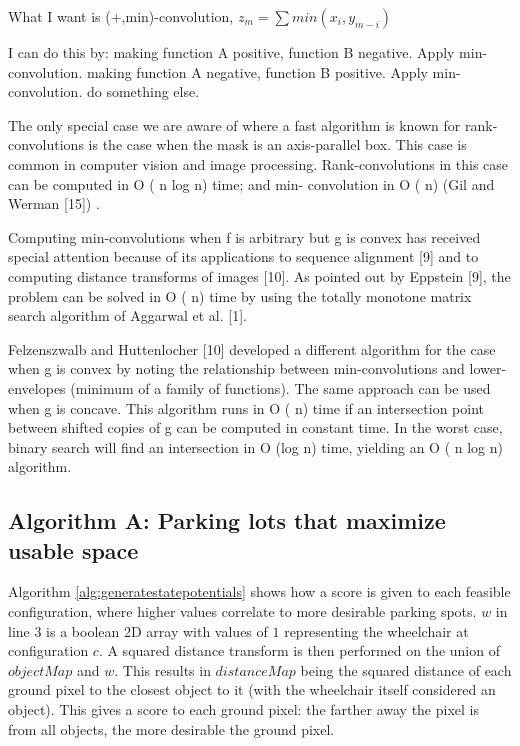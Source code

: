 What I want is (+,min)-convolution, $z_m = \sum min(x_i , y_{m-i})$

I can do this by:
making function A positive, function B negative.
Apply min-convolution.
making function A negative, function B positive.
Apply min-convolution.
do something else.


The only special case we are aware of where a fast algorithm is known for
rank-convolutions is the case when the mask is an axis-parallel box. This case
is common in computer vision and image processing. Rank-convolutions in this
case can be computed in O ( n log n) time; and min- convolution in O ( n) (Gil
and Werman [15]) \cite{babai2009computing}.

Computing min-convolutions when f is arbitrary but g is convex has received
special attention because of its applications to sequence alignment [9] and to
computing distance transforms of images [10]. As pointed out by Eppstein [9],
the problem can be solved in O ( n) time by using the totally monotone matrix
search algorithm of Aggarwal et al. [1].
\cite{babai2009computing}

Felzenszwalb and Huttenlocher [10] developed a different algorithm for the case
when g is convex by noting the relationship between min-convolutions and
lower-envelopes (minimum of a family of functions). The same approach can be
used when g is concave. This algorithm runs in O ( n) time if an intersection
point between shifted copies of g can be computed in constant time. In the worst
case, binary search will find an intersection in O (log n) time, yielding an O (
n log n) algorithm.
\cite{babai2009computing}

\subsection{Algorithm A: Parking lots that maximize usable space}
Algorithm \autoref{alg:generatestatepotentials} shows how a score is given to each
feasible configuration, where higher values correlate to more desirable parking
spots. $w$ in line 3 is a boolean 2D array with values of $1$ representing the
wheelchair at configuration $c$. A squared distance transform is then performed
on the union of $objectMap$ and $w$. This results in $distanceMap$ being the
squared distance of each ground pixel to the closest object to it (with the
wheelchair itself considered an object). This gives a score to each ground pixel:
the farther away the pixel is from all objects, the more desirable the ground
pixel. 

